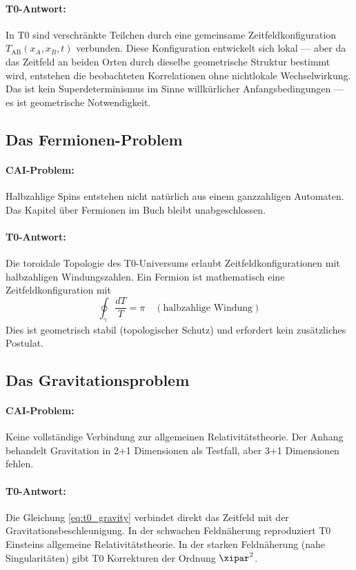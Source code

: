 \paragraph{T0-Antwort:} In T0 sind verschränkte Teilchen durch eine gemeinsame
Zeitfeldkonfiguration $T_{\text{AB}}(x_A, x_B, t)$ verbunden. Diese Konfiguration
entwickelt sich lokal — aber da das Zeitfeld an beiden Orten durch dieselbe
geometrische Struktur bestimmt wird, entstehen die beobachteten Korrelationen
ohne nichtlokale Wechselwirkung. Das ist kein Superdeterminismus im Sinne
willkürlicher Anfangsbedingungen — es ist geometrische Notwendigkeit.

\subsection{Das Fermionen-Problem}

\paragraph{CAI-Problem:} Halbzahlige Spins entstehen nicht natürlich aus einem
ganzzahligen Automaten. Das Kapitel über Fermionen im Buch bleibt unabgeschlossen.

\paragraph{T0-Antwort:} Die toroidale Topologie des T0-Universums erlaubt
Zeitfeldkonfigurationen mit halbzahligen Windungszahlen. Ein Fermion ist
mathematisch eine Zeitfeldkonfiguration mit
\begin{equation}
    \oint_\gamma \frac{d T}{T} = \pi \quad (\text{halbzahlige Windung})
    \label{eq:fermion_winding}
\end{equation}
Dies ist geometrisch stabil (topologischer Schutz) und erfordert kein
zusätzliches Postulat.

\subsection{Das Gravitationsproblem}

\paragraph{CAI-Problem:} Keine vollständige Verbindung zur allgemeinen
Relativitätstheorie. Der Anhang behandelt Gravitation in 2+1 Dimensionen
als Testfall, aber 3+1 Dimensionen fehlen.

\paragraph{T0-Antwort:} Die Gleichung \eqref{eq:t0_gravity} verbindet direkt
das Zeitfeld mit der Gravitationsbeschleunigung. In der schwachen Feldnäherung
reproduziert T0 Einsteins allgemeine Relativitätstheorie. In der starken
Feldnäherung (nahe Singularitäten) gibt T0 Korrekturen der Ordnung $\xipar^2$.

